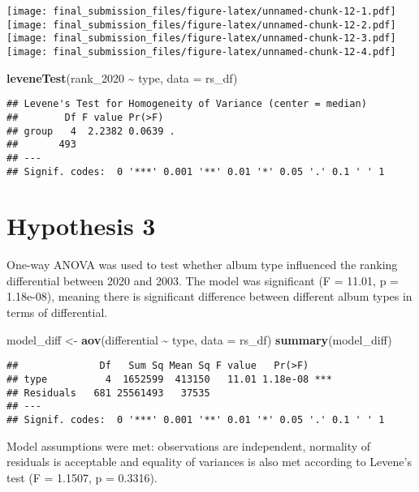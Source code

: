 \documentclass[
]{article}
\newenvironment{Shaded}{\begin{snugshade}}{\end{snugshade}}
\newcommand{\AttributeTok}[1]{\textcolor[rgb]{0.13,0.29,0.53}{#1}}
\newcommand{\FunctionTok}[1]{\textcolor[rgb]{0.13,0.29,0.53}{\textbf{#1}}}
\newcommand{\NormalTok}[1]{#1}
\newcommand{\OtherTok}[1]{\textcolor[rgb]{0.56,0.35,0.01}{#1}}
\newcommand{\SpecialCharTok}[1]{\textcolor[rgb]{0.81,0.36,0.00}{\textbf{#1}}}
\begin{document}
\texttt{[image: final\_submission\_files/figure-latex/unnamed-chunk-12-1.pdf]}
\texttt{[image: final\_submission\_files/figure-latex/unnamed-chunk-12-2.pdf]}
\texttt{[image: final\_submission\_files/figure-latex/unnamed-chunk-12-3.pdf]}
\texttt{[image: final\_submission\_files/figure-latex/unnamed-chunk-12-4.pdf]}

\begin{Shaded}
\begin{Highlighting}[]
\FunctionTok{leveneTest}\NormalTok{(rank\_2020 }\SpecialCharTok{\textasciitilde{}}\NormalTok{ type, }\AttributeTok{data =}\NormalTok{ rs\_df)}
\end{Highlighting}
\end{Shaded}

\begin{verbatim}
## Levene's Test for Homogeneity of Variance (center = median)
##        Df F value Pr(>F)  
## group   4  2.2382 0.0639 .
##       493                 
## ---
## Signif. codes:  0 '***' 0.001 '**' 0.01 '*' 0.05 '.' 0.1 ' ' 1
\end{verbatim}

\section{Hypothesis 3}\label{hypothesis-3}

One-way ANOVA was used to test whether album type influenced the ranking
differential between 2020 and 2003. The model was significant (F =
11.01, p = 1.18e-08), meaning there is significant difference between
different album types in terms of differential.

\begin{Shaded}
\begin{Highlighting}[]
\NormalTok{model\_diff }\OtherTok{\textless{}{-}} \FunctionTok{aov}\NormalTok{(differential }\SpecialCharTok{\textasciitilde{}}\NormalTok{ type, }\AttributeTok{data =}\NormalTok{ rs\_df)}
\FunctionTok{summary}\NormalTok{(model\_diff)}
\end{Highlighting}
\end{Shaded}

\begin{verbatim}
##              Df   Sum Sq Mean Sq F value   Pr(>F)    
## type          4  1652599  413150   11.01 1.18e-08 ***
## Residuals   681 25561493   37535                     
## ---
## Signif. codes:  0 '***' 0.001 '**' 0.01 '*' 0.05 '.' 0.1 ' ' 1
\end{verbatim}

Model assumptions were met: observations are independent, normality of
residuals is acceptable and equality of variances is also met according
to Levene's test (F = 1.1507, p = 0.3316).
\end{document}
